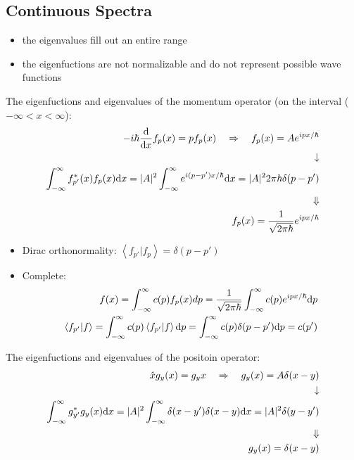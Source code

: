 \subsection{Continuous Spectra}
\begin{itemize}
	\item the eigenvalues fill out an entire range
	\item the eigenfuctions are not normalizable and do not represent possible wave functions
\end{itemize}
The eigenfuctions and eigenvalues of the momentum operator (on the interval (\(-\infty < x < \infty\)):
\[ \begin{split}
	-i\hbar \dv{x}f_p(x) = pf_p(x) \quad\Rightarrow\quad 
	f_p(x) = Ae^{ipx/\hbar} \\ \downarrow \\
	\int_{-\infty}^{\infty}f_{p'}^*(x)f_p(x){\rm d}x = |A|^2 \int_{-\infty}^{\infty}e^{i(p-p')x/\hbar}{\rm d}x=
	|A|^22\pi\hbar\delta(p-p') \\ \Downarrow \\
	f_p(x)=\frac{1}{\sqrt{2\pi\hbar}}e^{ipx/\hbar}
\end{split}
\]
\begin{itemize}
	\item Dirac orthonormality: \(\left\langle f_{p'}|f_p\right\rangle =\delta(p-p')\)
	\item Complete:\[\begin{split}
		f(x) = \int_{-\infty}^{\infty} c(p)f_p(x)dp =\frac{1}{\sqrt{2\pi\hbar}}\int_{-\infty}^\infty c(p)e^{ipx/\hbar}{\rm d}p\\
		\left\langle f_{p'}|f\right\rangle =\int_{-\infty}^{\infty}c(p)\left\langle f_{p'}|f\right\rangle {\rm d}p =
		\int_{-\infty}^{\infty}c(p)\delta(p-p'){\rm d}p=c(p')
	\end{split}\]
\end{itemize}
The eigenfuctions and eigenvalues of the positoin operator: 
\[\begin{split}
	\hat{x} g_y(x)= g_y{x}  \quad\Rightarrow \quad
	g_y(x) = A\delta(x-y) \\ \downarrow \\
	\int_{-\infty}^{\infty}g_{y'}^*g_y(x){\rm d}x = |A|^2 \int_{-\infty}^{\infty}\delta(x-y')\delta(x-y){\rm d}x =
	|A|^2\delta(y-y')  \\ \Downarrow \\
	g_y(x) = \delta(x-y)
\end{split}
\]

